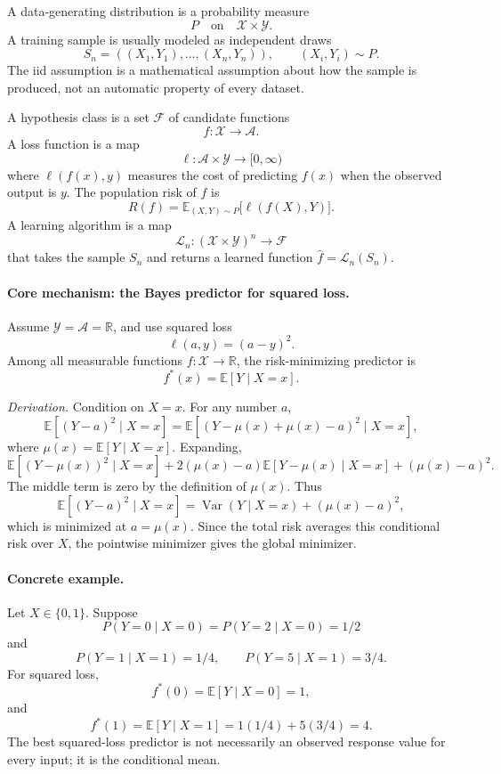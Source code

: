 A data-generating distribution is a probability measure
\[
P \quad \text{on} \quad \mathcal X\times\mathcal Y.
\]
A training sample is usually modeled as independent draws
\[
S_n=((X_1,Y_1),\ldots,(X_n,Y_n)),\qquad (X_i,Y_i)\sim P.
\]
The iid assumption is a mathematical assumption about how the sample is produced, not an automatic property of every dataset.

A hypothesis class is a set \(\mathcal F\) of candidate functions
\[
f:\mathcal X\to\mathcal A.
\]
A loss function is a map
\[
\ell:\mathcal A\times\mathcal Y\to[0,\infty)
\]
where \(\ell(f(x),y)\) measures the cost of predicting \(f(x)\) when the observed output is \(y\). The population risk of \(f\) is
\[
\boxed{
R(f)=\mathbb E_{(X,Y)\sim P}\bigl[\ell(f(X),Y)\bigr].
}
\]
A learning algorithm is a map
\[
\mathcal L_n:(\mathcal X\times\mathcal Y)^n\to \mathcal F
\]
that takes the sample \(S_n\) and returns a learned function \(\widehat f=\mathcal L_n(S_n)\).

\paragraph{Core mechanism: the Bayes predictor for squared loss.}
Assume \(\mathcal Y=\mathcal A=\mathbb R\), and use squared loss
\[
\ell(a,y)=(a-y)^2.
\]
Among all measurable functions \(f:\mathcal X\to\mathbb R\), the risk-minimizing predictor is
\[
\boxed{
f^*(x)=\mathbb E[Y\mid X=x].
}
\]

\emph{Derivation.} Condition on \(X=x\). For any number \(a\),
\[
\mathbb E[(Y-a)^2\mid X=x]
=\mathbb E[(Y-\mu(x)+\mu(x)-a)^2\mid X=x],
\]
where \(\mu(x)=\mathbb E[Y\mid X=x]\). Expanding,
\[
\mathbb E[(Y-\mu(x))^2\mid X=x]
+2(\mu(x)-a)\mathbb E[Y-\mu(x)\mid X=x]
+(\mu(x)-a)^2.
\]
The middle term is zero by the definition of \(\mu(x)\). Thus
\[
\mathbb E[(Y-a)^2\mid X=x]
=\operatorname{Var}(Y\mid X=x)+(\mu(x)-a)^2,
\]
which is minimized at \(a=\mu(x)\). Since the total risk averages this conditional risk over \(X\), the pointwise minimizer gives the global minimizer.

\paragraph{Concrete example.}
Let \(X\in\{0,1\}\). Suppose
\[
P(Y=0\mid X=0)=P(Y=2\mid X=0)=1/2
\]
and
\[
P(Y=1\mid X=1)=1/4,\qquad P(Y=5\mid X=1)=3/4.
\]
For squared loss,
\[
f^*(0)=\mathbb E[Y\mid X=0]=1,
\]
and
\[
f^*(1)=\mathbb E[Y\mid X=1]=1(1/4)+5(3/4)=4.
\]
The best squared-loss predictor is not necessarily an observed response value for every input; it is the conditional mean.

